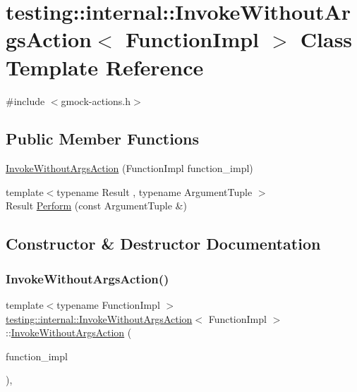 \hypertarget{classtesting_1_1internal_1_1_invoke_without_args_action}{}\section{testing\+:\+:internal\+:\+:Invoke\+Without\+Args\+Action$<$ Function\+Impl $>$ Class Template Reference}
\label{classtesting_1_1internal_1_1_invoke_without_args_action}


{\ttfamily \#include $<$gmock-\/actions.\+h$>$}

\subsection*{Public Member Functions}
\begin{DoxyCompactItemize}
\item 
\hyperlink{classtesting_1_1internal_1_1_invoke_without_args_action_a05d4006d8ab70e78172bf678b1d15f18}{Invoke\+Without\+Args\+Action} (Function\+Impl function\+\_\+impl)
\item 
{\footnotesize template$<$typename Result , typename Argument\+Tuple $>$ }\\Result \hyperlink{classtesting_1_1internal_1_1_invoke_without_args_action_abdad2b7d19ff1cbd1d07a4bd585e3f4c}{Perform} (const Argument\+Tuple \&)
\end{DoxyCompactItemize}


\subsection{Constructor \& Destructor Documentation}
\mbox{\label{classtesting_1_1internal_1_1_invoke_without_args_action_a05d4006d8ab70e78172bf678b1d15f18}} 
\subsubsection{\texorpdfstring{Invoke\+Without\+Args\+Action()}{InvokeWithoutArgsAction()}}
{\footnotesize\ttfamily template$<$typename Function\+Impl $>$ \\
\hyperlink{classtesting_1_1internal_1_1_invoke_without_args_action}{testing\+::internal\+::\+Invoke\+Without\+Args\+Action}$<$ Function\+Impl $>$\+::\hyperlink{classtesting_1_1internal_1_1_invoke_without_args_action}{Invoke\+Without\+Args\+Action} (\begin{DoxyParamCaption}\item[{Function\+Impl}]{function\+\_\+impl }\end{DoxyParamCaption})\hspace{0.3cm}{\ttfamily [inline]}, {\ttfamily [explicit]}}



